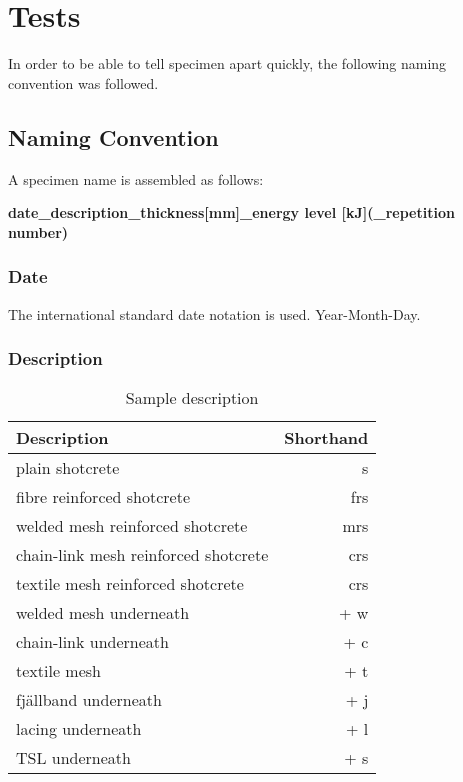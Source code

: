 \chapter{Tests}
\label{cha:test}

 In order to be able to tell specimen apart quickly, the following naming convention was followed.

\section{Naming Convention}

A specimen name is assembled as follows:


\centering
\textbf{date\_description\_thickness[mm]\_energy level [kJ](\_repetition number)}
\flushleft

\subsection*{Date}

The international standard date notation is used. Year-Month-Day.

\subsection*{Description}

\begin{table}
\centering
\begin{tabular}{lr}
\toprule
Description & Shorthand \\
\midrule
plain shotcrete & s\\
fibre reinforced shotcrete & frs \\
welded mesh reinforced shotcrete & mrs \\
chain-link mesh reinforced shotcrete & crs \\
textile mesh reinforced shotcrete & crs \\
\hline
welded mesh underneath & + w \\
chain-link underneath & + c \\
textile mesh & + t\\
fjällband underneath & + j\\
lacing underneath & + l\\
TSL underneath & + s\\
\bottomrule
\end{tabular}
\caption{Sample description}
\label{tab:samdes}
\end{table}

